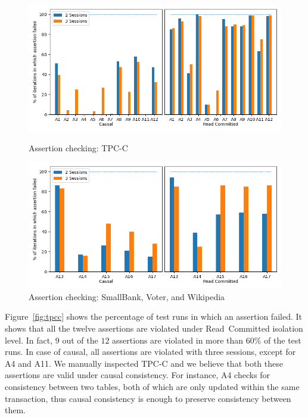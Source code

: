 \begin{figure}[!ht]
    \centering
    \begin{minipage}{0.47\textwidth}
        \centering
    	\includegraphics[scale=0.4]{Sources/sql/plots/random_strongest_tpcc.png}
	    \caption{\small Assertion checking: {TPC-C}}
        \label{fig:tpcc}
    \end{minipage}\hfill
    \begin{minipage}{0.47\textwidth}
        \centering
    \includegraphics[scale=0.4]{Sources/sql/plots/random_strongest_all.png}
	    \caption{\small Assertion checking: SmallBank, Voter, and Wikipedia}
    \label{fig:rest}
    \end{minipage}
\end{figure}

Figure~\ref{fig:tpcc} %
shows the percentage of test runs in which an assertion failed. 
It shows that all the twelve assertions are violated under
Read~Committed isolation level. In fact, $9$ out of the $12$ 
assertions are violated in more than 60\% of the test runs.
In case of causal, %
all assertions are violated
with three sessions, except for A4 and A11. We manually inspected TPC-C and
we believe that both these assertions are valid under causal consistency. 
For instance, A4 checks for consistency between two tables, both of which are
only updated within the same transaction, thus causal consistency is enough to
preserve consistency between them.

